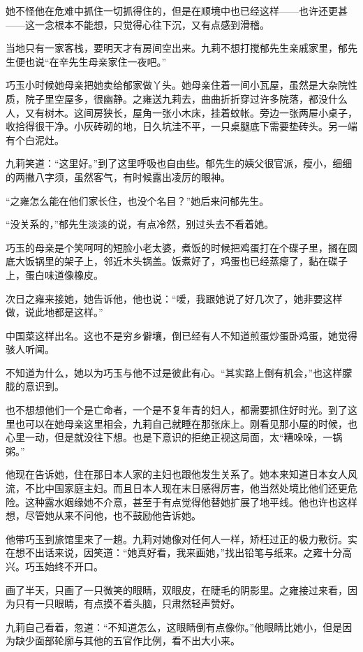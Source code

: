 \par 她不怪他在危难中抓住一切抓得住的，但是在顺境中也已经这样——也许还更甚——这一念根本不能想，只觉得心往下沉，又有点感到滑稽。
\par 当地只有一家客栈，要明天才有房间空出来。九莉不想打搅郁先生亲戚家里，郁先生便也说“在辛先生母亲家住一夜吧。”
\par 巧玉小时候她母亲把她卖给郁家做丫头。她母亲住着一间小瓦屋，虽然是大杂院性质，院子里空屋多，很幽静。之雍送九莉去，曲曲折折穿过许多院落，都没什么人，又有树木。这间房狭长，屋角一张小木床，挂着蚊帐。旁边一张两屉小桌子，收拾得很干净。小灰砖砌的地，日久坑洼不平，一只桌腿底下需要垫砖头。另一端有个白泥灶。
\par 九莉笑道：“这里好。”到了这里呼吸也自由些。郁先生的姨父很官派，瘦小，细细的两撇八字须，虽然客气，有时候露出凌厉的眼神。
\par “之雍怎么能在他们家长住，也没个名目？”她后来问郁先生。
\par “没关系的，”郁先生淡淡的说，有点冷然，别过头去不看着她。
\par 巧玉的母亲是个笑呵呵的短脸小老太婆，煮饭的时候把鸡蛋打在个碟子里，搁在圆底大饭锅里的架子上，邻近木头锅盖。饭煮好了，鸡蛋也已经蒸瘪了，黏在碟子上，蛋白味道像橡皮。
\par 次日之雍来接她，她告诉他，他也说：“嗳，我跟她说了好几次了，她非要这样做，说此地都是这样。”
\par 中国菜这样出名。这也不是穷乡僻壤，倒已经有人不知道煎蛋炒蛋卧鸡蛋，她觉得骇人听闻。
\par 不知道为什么，她以为巧玉与他不过是彼此有心。“其实路上倒有机会，”也这样朦胧的意识到。
\par 也不想想他们一个是亡命者，一个是不复年青的妇人，都需要抓住好时光。到了这里也可以在她母亲这里相会，九莉自己就睡在那张床上。刚看见那小屋的时候，也心里一动，但是就没往下想。也是下意识的拒绝正视这局面，太“糟哚哚，一锅粥。”
\par 他现在告诉她，住在那日本人家的主妇也跟他发生关系了。她本来知道日本女人风流，不比中国家庭主妇。而且日本人现在末日感得厉害，他当然处境比他们还更危险。这种露水姻缘她不介意，甚至于有点觉得他替她扩展了地平线。他也许也这样想，尽管她从来不问他，也不鼓励他告诉她。
\par 他带巧玉到旅馆里来了一趟。九莉对她像对任何人一样，矫枉过正的极力敷衍。实在想不出话来说，因笑道：“她真好看，我来画她，”找出铅笔与纸来。之雍十分高兴。巧玉始终不开口。
\par 画了半天，只画了一只微笑的眼睛，双眼皮，在睫毛的阴影里。之雍接过来看，因为只有一只眼睛，有点摸不着头脑，只肃然轻声赞好。
\par 九莉自己看着，忽道：“不知道怎么，这眼睛倒有点像你。”他眼睛比她小，但是因为缺少面部轮廓与其他的五官作比例，看不出大小来。
